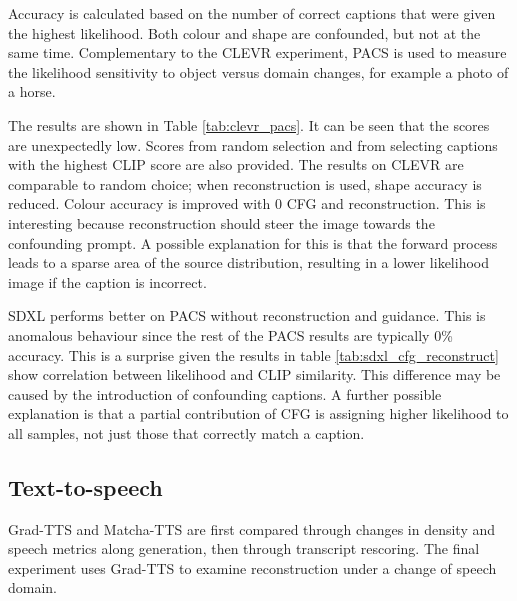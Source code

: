 Accuracy is calculated based on the number of correct captions that were given the highest likelihood. Both colour and shape are confounded, but not at the same time. Complementary to the CLEVR experiment, PACS is used to measure the likelihood sensitivity to object versus domain changes, for example a photo of a horse.

The results are shown in Table \ref{tab:clevr_pacs}. It can be seen that the scores are unexpectedly low. Scores from random selection and from selecting captions with the highest CLIP score are also provided. The results on CLEVR are comparable to random choice; when reconstruction is used, shape accuracy is reduced. Colour accuracy is improved with 0 \ac{CFG} and reconstruction. This is interesting because reconstruction should steer the image towards the confounding prompt. A possible explanation for this is that the forward process leads to a sparse area of the source distribution, resulting in a lower likelihood image if the caption is incorrect.

SDXL performs better on PACS without reconstruction and guidance. This is anomalous behaviour since the rest of the PACS results are typically 0\% accuracy. This is a surprise given the results in table \ref{tab:sdxl_cfg_reconstruct} show correlation between likelihood and CLIP similarity. This difference may be caused by the introduction of confounding captions. A further possible explanation is that a partial contribution of \ac{CFG} is assigning higher likelihood to all samples, not just those that correctly match a caption.

\subsection{Text-to-speech}
\label{sec:Grad-TTS encoder and decoder output}
\label{sec:likelihood-speech}
Grad-TTS and Matcha-TTS are first compared through changes in density and speech metrics along generation, then through transcript rescoring. The final experiment uses Grad-TTS to examine reconstruction under a change of speech domain.

